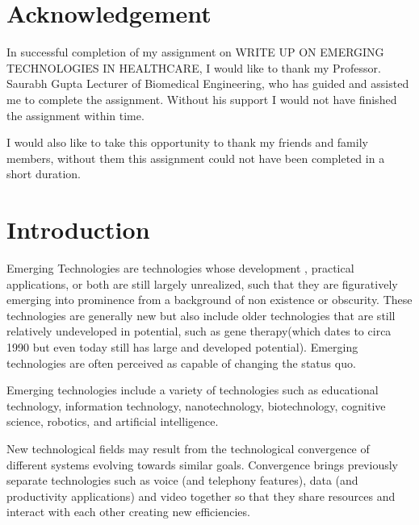 \documentclass[12pt,a4paper]{article}
\begin{document}
\clearpage
\tableofcontents
\clearpage


\section{Acknowledgement}

\hspace{1cm}

In successful completion of my assignment on WRITE UP ON EMERGING TECHNOLOGIES IN HEALTHCARE, I would like to thank my Professor. Saurabh Gupta Lecturer of Biomedical Engineering, who has guided and assisted me to complete the assignment. Without his support I would not have finished the assignment within time.


I would also like to take this opportunity to thank my friends and family members, without them this assignment could not have been completed in a short duration.

\clearpage

\section{Introduction}

\hspace{1cm}

Emerging Technologies are technologies whose development , practical applications, or both are still largely unrealized, such that they are figuratively emerging into prominence from a background of non existence or obscurity. These technologies are generally new but also include older technologies that are still relatively undeveloped in potential, such as gene therapy(which dates to circa 1990 but even today still has large and developed potential). Emerging technologies are often perceived as capable of changing the status quo.

Emerging technologies include a variety of technologies such as educational technology, information technology, nanotechnology, biotechnology, cognitive science, robotics, and artificial intelligence.


New technological fields may result from the technological convergence of different systems evolving towards similar goals. Convergence brings previously separate technologies such as voice (and telephony features), data (and productivity applications) and video together so that they share resources and interact with each other creating new efficiencies. 


\hspace{5cm}
\end{document}
